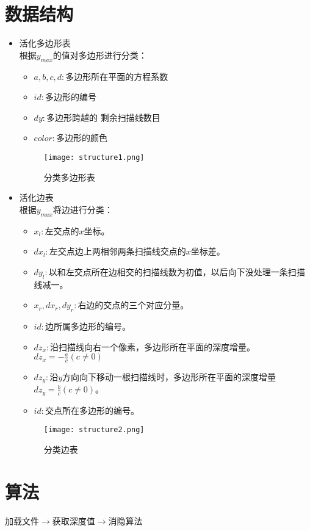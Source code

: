 \documentclass[10pt]{article}
\begin{document}
\section{数据结构}
\begin{itemize}
\item{活化多边形表} \\
根据$y_{max}$的值对多边形进行分类：
\begin{itemize}
\item{$a,b,c,d:$多边形所在平面的方程系数}
\item{$id:$多边形的编号}
\item{$dy:$多边形跨越的{\color{red} 剩余}扫描线数目}
\item{$color:$多边形的颜色}
\end{itemize}
\begin{figure}[H]
\begin{center}
\texttt{[image: structure1.png]}
\end{center}
\caption{分类多边形表}
\end{figure}

\item{活化边表}\\
根据$y_{max}$将边进行分类：
\begin{itemize}
\item{$x_l:$左交点的$x$坐标。}
\item{$dx_l:$左交点边上两相邻两条扫描线交点的$x$坐标差。}
\item{$dy_l:$以和左交点所在边相交的扫描线数为初值，以后向下没处理一条扫描线减一。}
\item{$x_r,dx_r,dy_r:$右边的交点的三个对应分量。}
\item{$id:$边所属多边形的编号。}
\item{$dz_x:$沿扫描线向右一个像素，多边形所在平面的深度增量。$dz_x=-\frac{a}{c}(c \neq 0)$}
\item{$dz_y:$沿$y$方向向下移动一根扫描线时，多边形所在平面的深度增量$dz_y=\frac{b}{c}(c \neq 0)$。}
\item{$id:$交点所在多边形的编号。}
\end{itemize}
\begin{figure}[H]
\begin{center}
\texttt{[image: structure2.png]}
\end{center}
\caption{分类边表}
\end{figure}
\end{itemize}

\section{算法}
加载文件$\to$获取深度值$\to$消隐算法
\end{document}
